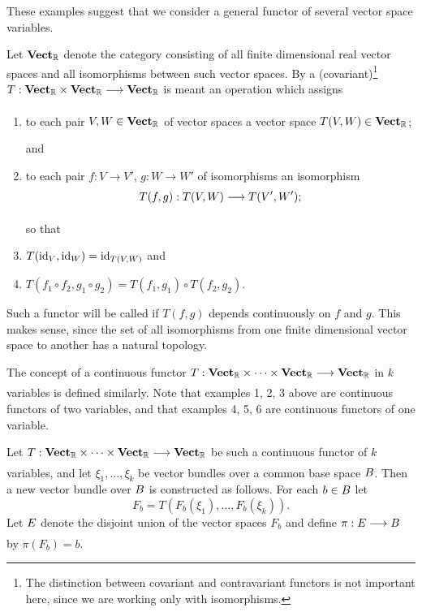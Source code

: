 \documentclass[../main]{subfiles}
\begin{document}
These examples suggest that we consider a general functor of several vector space variables.


\begin{definition}\label{def:03.04}
Let $\mathbf{Vect}_{\mathbb{R}}$ denote the category consisting of all finite dimensional real
vector spaces and all isomorphisms between such vector spaces. By a
(covariant)\footnote{The distinction between covariant and contravariant functors is not important here, since we are working only with isomorphisms.}  $T : \vectCat_{\mathbb{R}}\times\vectCat_{\mathbb{R}} \varrightarrow{} \vectCat_{\mathbb{R}}$ is meant an operation which assigns
\begin{enumerate}
	\item to each pair $V, W\in \mathbf{Vect}_{\mathbb{R}}$ of vector spaces a vector space $T(V, W)\in\mathbf{Vect}_{\mathbb{R}}$;

and

	\item to each pair $f : V \to V'$, $g : W \to W'$ of isomorphisms an isomorphism
	\[
	T(f, g): T(V, W) \varrightarrow{} T(V', W');
	\]

so that

	\item $T(\operatorname{id}_V,\operatorname{id}_W)=\operatorname{id}_{T(V,W)}$ and
	\item $T(f_{1} \circ f_{2}, g_{1} \circ g_{2})=T(f_{1}, g_{1}) \circ T(f_{2}, g_{2})$.
\end{enumerate}
Such a functor will be called  if $T(f, g)$ depends continuously on $f$ and $g$. This makes sense, since the set of all isomorphisms from one finite dimensional vector space to another has a natural topology.
\end{definition}


The concept of a continuous functor $T : \vectCat_{\mathbb{R}}\times\dots\times\vectCat_{\mathbb{R}}\varrightarrow{}\vectCat_{\mathbb{R}}$ in $k$ variables is defined similarly. Note that examples 1, 2, 3 above are continuous functors of two variables, and that examples 4, 5, 6 are continuous functors of one variable.

Let $T:\vectCat_{\mathbb{R}}\times\dots\times\vectCat_{\mathbb{R}}\varrightarrow{}\vectCat_{\mathbb{R}}$ be such a continuous functor of $k$ variables, and let $\xi_1,\dots,\xi_k$ be vector bundles over a common base space $B$. Then a new vector bundle over $B$ is constructed as follows. For each $b\in B$ let
\[
F_{b}=T(F_{b}(\xi_{1}), \dots, F_{b}(\xi_{k})).
\]
Let $E$ denote the disjoint union of the vector spaces $F_b$ and define
$\pi:\total \varrightarrow{} B$ by $\pi(F_b) = b$.
\end{document}

